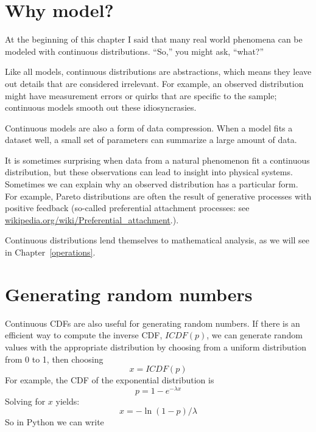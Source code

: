 \documentclass[12pt]{book}
\begin{document}
\section{Why model?}


At the beginning of this chapter I said that many real world phenomena
can be modeled with continuous distributions.  ``So,'' you might ask,
``what?''


Like all models, continuous distributions are abstractions, which
means they leave out details that are considered irrelevant.
For example, an observed distribution might have measurement errors
or quirks that are specific to the sample; continuous models smooth
out these idiosyncrasies.


Continuous models are also a form of data compression.  When a model
fits a dataset well, a small set of parameters can summarize a
large amount of data.


It is sometimes surprising when data from a natural phenomenon fit a
continuous distribution, but these observations can lead to insight
into physical systems.  Sometimes we can explain why an observed
distribution has a particular form.  For example, Pareto distributions
are often the result of generative processes with positive feedback
(so-called preferential attachment processes: see
\url{wikipedia.org/wiki/Preferential_attachment}.).




Continuous distributions lend themselves to mathematical analysis, as
we will see in Chapter~\ref{operations}.


\section{Generating random numbers}


Continuous CDFs are also useful for generating random numbers.
If there is an efficient way to compute the inverse CDF, $ICDF(p)$,
we can generate random values with the appropriate distribution
by choosing from a uniform distribution from 0 to 1, then choosing
%
\[ x = ICDF(p) \]
%
For example, the CDF of the exponential distribution is
%
\[ p = 1 - e^{-\lambda x} \]
%
Solving for $x$ yields:
%
\[ x = -\ln (1-p) / \lambda \]
%
So in Python we can write
\end{document}
